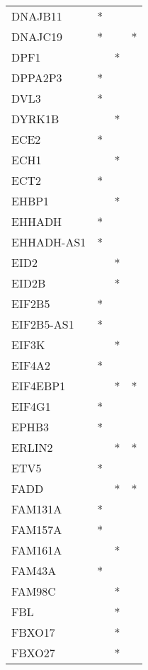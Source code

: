 \begin{longtable}{lccc}
DNAJB11          &     * &    &         \\
DNAJC19          &     * &    &       * \\
DPF1             &       &  * &         \\
DPPA2P3          &     * &    &         \\
DVL3             &     * &    &         \\
DYRK1B           &       &  * &         \\
ECE2             &     * &    &         \\
ECH1             &       &  * &         \\
ECT2             &     * &    &         \\
EHBP1            &       &  * &         \\
EHHADH           &     * &    &         \\
EHHADH-AS1       &     * &    &         \\
EID2             &       &  * &         \\
EID2B            &       &  * &         \\
EIF2B5           &     * &    &         \\
EIF2B5-AS1       &     * &    &         \\
EIF3K            &       &  * &         \\
EIF4A2           &     * &    &         \\
EIF4EBP1         &       &  * &       * \\
EIF4G1           &     * &    &         \\
EPHB3            &     * &    &         \\
ERLIN2           &       &  * &       * \\
ETV5             &     * &    &         \\
FADD             &       &  * &       * \\
FAM131A          &     * &    &         \\
FAM157A          &     * &    &         \\
FAM161A          &       &  * &         \\
FAM43A           &     * &    &         \\
FAM98C           &       &  * &         \\
FBL              &       &  * &         \\
FBXO17           &       &  * &         \\
FBXO27           &       &  * &         \\

\end{longtable}
